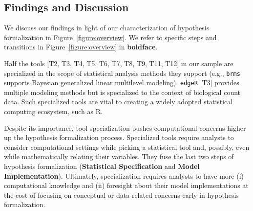 \subsection{Findings and Discussion}
\tableSoftwareAnalysis
We discuss our findings in light of our characterization of hypothesis
formalization in Figure~\ref{figure:overview}. We refer to specific steps and
transitions in Figure~\ref{figure:overview} in \textbf{boldface}.


Half the tools [T2, T3, T4, T5, T6, T7, T8, T9, T11, T12] in our sample are
specialized in the scope of statistical analysis methods they support (e.g.,
\texttt{brms} supports Bayesian generalized linear multilevel modeling).
\texttt{edgeR} [T3] provides multiple modeling methods but is specialized to the
context of biological count data. Such specialized tools are vital to creating a
widely adopted statistical computing ecosystem, such as R. 

Despite its importance, tool specialization pushes computational concerns higher
up the hypothesis formalization process. Specialized tools require
analysts to consider computational settings while picking a statistical tool
and, possibly, even while mathematically relating their variables. They fuse the
last two steps of hypothesis formalization (\textbf{Statistical Specification}
and \textbf{Model Implementation}). Ultimately, specialization requires analysts
to have more (i) computational knowledge and (ii) foresight about their model
implementations at the cost of focusing on conceptual or data-related concerns
early in hypothesis formalization. 


